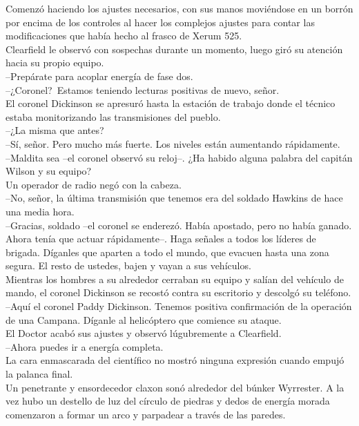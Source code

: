 Comenzó haciendo los ajustes necesarios, con sus manos moviéndose en un
borrón por encima de los controles al hacer los complejos ajustes para
contar las modificaciones que había hecho al frasco de Xerum 525.\\
Clearfield le observó con sospechas durante un momento, luego giró su
atención hacia su propio equipo.\\
--Prepárate para acoplar energía de fase
dos.\\[2\baselineskip]--¿Coronel?~Estamos teniendo lecturas positivas
de nuevo, señor.\\
El coronel Dickinson se apresuró hasta la estación de trabajo donde el
técnico estaba monitorizando las transmisiones del pueblo.\\
--¿La misma que antes?\\
--Sí, señor. Pero mucho más fuerte. Los niveles están aumentando
rápidamente.\\
--Maldita sea --el coronel observó su reloj--. ¿Ha habido alguna palabra
del capitán Wilson y su equipo?\\
Un operador de radio negó con la cabeza.\\
--No, señor, la última transmisión que tenemos era del soldado Hawkins
de hace una media hora.\\
--Gracias, soldado --el coronel se enderezó. Había apostado, pero no
había ganado. Ahora tenía que actuar rápidamente--. Haga señales a todos
los líderes de brigada. Díganles que aparten a todo el mundo, que
evacuen hasta una zona segura. El resto de ustedes, bajen y vayan a sus
vehículos.\\
Mientras los hombres a su alrededor cerraban su equipo y salían del
vehículo de mando, el coronel Dickinson se recostó contra su escritorio
y descolgó su teléfono.\\
--Aquí el coronel Paddy Dickinson. Tenemos positiva confirmación de la
operación de una Campana. Díganle al helicóptero que comience su
ataque.\\[2\baselineskip]El Doctor acabó sus ajustes y observó
lúgubremente a Clearfield.\\
--Ahora puedes ir a energía completa.\\
La cara enmascarada del científico no mostró ninguna expresión cuando
empujó la palanca final.\\[2\baselineskip]Un penetrante y ensordecedor
claxon sonó alrededor del búnker Wyrrester. A la vez hubo un destello de
luz del círculo de piedras y dedos de energía morada comenzaron a formar
un arco y parpadear a través de las paredes.\\
